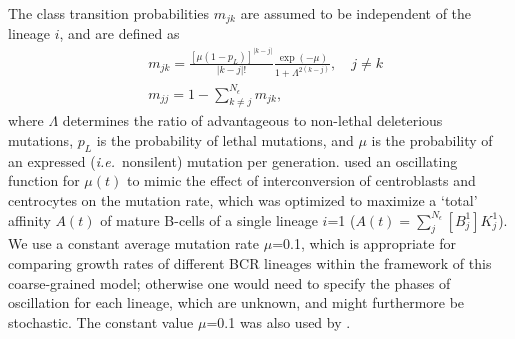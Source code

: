 \documentclass[utf8]{frontiersHLTH}%
\newcommand{\vo}[1]{#1} %
\newcommand{\comment}[1]{} %
\newcommand{\snorm}[1]{\lvert#1\rvert}
\def\ie {{\it i.e.}}
\begin{document}
The class transition probabilities $m_{jk}$ are assumed to be independent of the lineage $i$, and are defined as
\begin{equation}
 \begin{aligned}
  &m_{jk}=\frac{\left[\mu(1-p_L)\right]^{\snorm{k-j}}}{\snorm{k-j}!} \frac{\exp(-\mu)}{1+\Lambda^{2(k-j)}}, \quad j\ne k \\
  &m_{jj}=1-\sum_{k\ne j}^{N_\epsilon} m_{jk},
 \end{aligned}
\end{equation}
where $\Lambda$ \vo{determines} the ratio of advantageous to non-lethal deleterious mutations, $p_L$ is the probability of lethal mutations,
and $\mu$ is the probability of an expressed (\ie~nonsilent) mutation per generation.\cite{kepler93}
\citet{kepler93} used an oscillating function for $\mu(t)$ to mimic the effect of interconversion of centroblasts
and centrocytes on the mutation rate, which was optimized to maximize a `total' affinity $A(t)$ 
of mature B-cells of a single lineage $i$=1 ($A(t)=\sum_j^{N_\epsilon} [B_j^1]K_j^1$).
We use a constant average mutation rate $\mu$=0.1, which is \comment{more} appropriate for comparing growth rates of different BCR 
lineages within the framework of this coarse-grained model; otherwise one would need to specify the phases of oscillation for
each lineage, which are unknown, and might furthermore be stochastic.
The constant value $\mu$=0.1 was also used by \citet{oprea97}.
\end{document}
